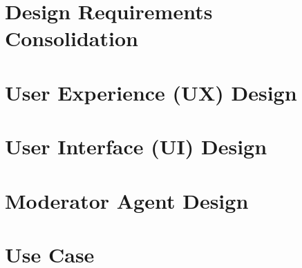 \section{Design Requirements Consolidation}
\label{sec:rd-consolidation}

\section{User Experience (UX) Design}
\label{sec:rd-ux}

\section{User Interface (UI) Design}
\label{sec:rd-ui}

\section{Moderator Agent Design}
\label{sec:rd-moderator-agent}

\section{Use Case}
\label{sec:rd-use-case}
